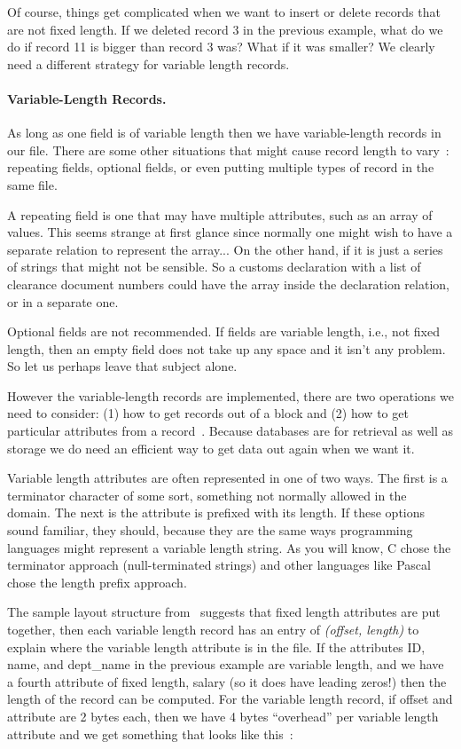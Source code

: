 \documentclass[a4paper]{report}
\begin{document}
Of course, things get complicated when we want to insert or delete records that are not fixed length. If we deleted record 3 in the previous example, what do we do if record 11 is bigger than record 3 was? What if it was smaller? We clearly need a different strategy for variable length records.



\paragraph{Variable-Length Records.}

As long as one field is of variable length then we have variable-length records in our file. There are some other situations that might cause record length to vary~\cite{fds}: repeating fields, optional fields, or even putting multiple types of record in the same file. 

A repeating field is one that may have multiple attributes, such as an array of values. This seems strange at first glance since normally one might wish to have a separate relation to represent the array... On the other hand, if it is just a series of strings that might not be sensible. So a customs declaration with a list of clearance document numbers could have the array inside the declaration relation, or in a separate one.

Optional fields are not recommended. If fields are variable length, i.e., not fixed length, then an empty field does not take up any space and it isn't any problem. So let us perhaps leave that subject alone. 

However the variable-length records are implemented, there are two operations we need to consider: (1) how to get records out of a block and (2) how to get particular attributes from a record~\cite{dsc}. Because databases are for retrieval as well as storage we do need an efficient way to get data out again when we want it.

Variable length attributes are often represented in one of two ways. The first is a terminator character of some sort, something not normally allowed in the domain. The next is the attribute is prefixed with its length. If these options sound familiar, they should, because they are the same ways programming languages might represent a variable length string. As you will know, C chose the terminator approach (null-terminated strings) and other languages like Pascal chose the length prefix approach.

The sample layout structure from~\cite{dsc} suggests that fixed length attributes are put together, then each variable length record has an entry of \textit{(offset, length)}  to explain where the variable length attribute is in the file. If the attributes ID, name, and dept\_name in the previous example are variable length, and we have a fourth attribute of fixed length, salary (so it does have leading zeros!) then the length of the record can be computed. For the variable length record, if offset and attribute are 2 bytes each, then we have 4 bytes ``overhead'' per variable length attribute and we get something that looks like this~\cite{dsc}:
\end{document}
